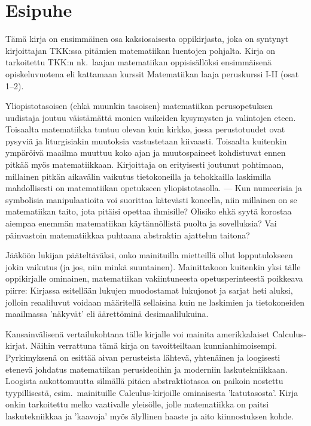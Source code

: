 \chapter*{Esipuhe}

Tämä kirja on ensimmäinen osa kaksiosaisesta oppikirjasta, joka on syntynyt kirjoittajan
TKK:ssa pitämien matematiikan luentojen pohjalta. Kirja on tarkoitettu TKK:n nk.\ laajan 
matematiikan oppisisällöksi ensimmäisenä opiskeluvuotena eli kattamaan kurssit 
Matematiikan laaja peruskurssi I-II (osat 1--2).

Yliopistotasoisen (ehkä muunkin tasoisen) matematiikan perusopetuksen uudistaja joutuu 
väistämättä monien vaikeiden kysymysten ja valintojen eteen. Toisaalta matematiikka tuntuu 
olevan kuin kirkko, jossa perustotuudet ovat pysyviä ja liturgisiakin muutoksia vastustetaan
kiivaasti. Toisaalta kuitenkin ympäröivä maailma muuttuu koko ajan ja muutospaineet
kohdistuvat ennen pitkää myös matematiikkaan. Kirjoittaja on erityisesti joutunut pohtimaan,
millainen pitkän aikavälin vaikutus tietokoneilla ja tehokkailla laskimilla mahdollisesti on
matematiikan opetukseen yliopistotasolla. --- Kun numeerisia ja symbolisia manipulaatioita
voi suorittaa kätevästi koneella, niin millainen on se matematiikan taito, jota pitäisi
opettaa ihmisille? Olisiko ehkä syytä korostaa aiempaa enemmän matematiikan käytännöllistä
puolta ja sovelluksia? Vai päinvastoin matematiikkaa puhtaana abstraktin ajattelun taitona? 

Jääköön lukijan pääteltäväksi, onko mainituilla mietteillä ollut lopputulokseen jokin 
vaikutus (ja jos, niin minkä suuntainen). Mainittakoon kuitenkin yksi tälle oppikirjalle 
ominainen, matematiikan vakiintuneesta opetusperinteestä poikkeava piirre: Kirjassa
esitellään lukujen muodostamat lukujonot ja sarjat heti aluksi, jolloin reaaliluvut voidaan
määritellä sellaisina kuin ne laskimien ja tietokoneiden maailmassa 'näkyvät' eli äärettöminä
desimaalilukuina.

Kansainvälisenä vertailukohtana tälle kirjalle voi mainita amerikkalaiset Calculus-kirjat. 
Näihin verrattuna tämä kirja on tavoitteiltaan kunnianhimoisempi. Pyrkimyksenä on esittää
aivan perusteista lähtevä, yhtenäinen ja loogisesti etenevä johdatus matematiikan
perusideoihin ja moderniin laskutekniikkaan. Loogista aukottomuutta silmällä pitäen
abstraktiotasoa on paikoin nostettu tyypillisestä, esim.\ mainituille Calculus-kirjoille
ominaisesta 'katutasosta'. Kirja onkin tarkoitettu melko vaativalle yleisölle, jolle
matematiikka on paitsi laskutekniikkaa ja 'kaavoja' myös älyllinen haaste ja aito
kiinnostuksen kohde.

